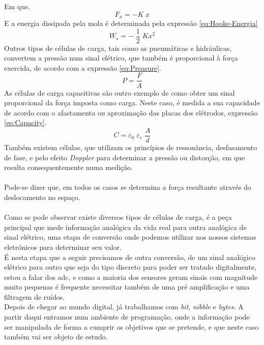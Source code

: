 Em que.
\begin{equation}
	\label{eq:Lei-de-Hooke}
	F_x = -K \; x
\end{equation}
E a energia dissipada pela mola é determinada pela expressão \ref{eq:Hooke-Energia}
\begin{equation}
	\label{eq:Hooke-Energia}
	W_s = - \; \frac{1}{2} \; K x^2
\end{equation}
Outros tipos de células de carga, tais como as pneumáticas e hidráulicas, convertem a pressão num sinal elétrico, que também é proporcional à força exercida, de acordo com a expressão \ref{eq:Preasure}.
\begin{equation}
	\label{eq:Preasure}
	P = \frac{F}{A}
\end{equation}
As células de carga capacitivas são outro exemplo de como obter um sinal proporcional da força imposta como carga. Neste caso, é medida a sua capacidade de acordo com o afastamento ou aproximação das placas dos elétrodos, expressão \ref{eq:Capacity}.
\begin{equation}
	\label{eq:Capacity}
	C = \varepsilon_{0} \; \varepsilon_{r} \; \frac{A}{d}
\end{equation}
Também existem células, que utilizam os princípios de ressonância, desfasamento de fase, e pelo efeito \textit{Doppler} para determinar a pressão ou distorção, em que resulta consequentemente numa medição.
\\
\\
Pode-se dizer que, em todos os casos se determina a força resultante através do deslocamento no espaço.
\\
\\
Como se pode observar existe diversos tipos de células de carga, é a peça principal que mede informação analógica da vida real para outra analógica de sinal elétrico, uma etapa de conversão onde podemos utilizar nos nossos sistemas eletrónicos para determinar seu valor.
\\
É nesta etapa que a seguir precisamos de outra conversão, de um sinal analógico elétrico para outro que seja do tipo discreto para poder ser tratado digitalmente, estou a falar dos \ac{adc}, e como a maioria dos sensores geram sinais com magnitude muito pequenas é frequente necessitar também de uma pré amplificação e uma filtragem de ruídos.
\\
Depois de chegar ao mundo digital, já trabalhamos com \textit{bit}, \textit{nibble} e \textit{bytes}. A partir daqui entramos num ambiente de programação, onde a informação pode ser manipulada de forma a cumprir os objetivos que se pretende, e que neste caso também vai ser objeto de estudo.
